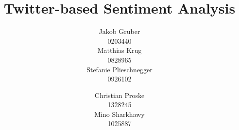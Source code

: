 \documentclass{acm_proc_article-sp}
\begin{document}
\title{Twitter-based Sentiment Analysis}

%
%
%
%
%

%
\author{
%
%
\alignauthor Jakob Gruber\\
      0203440\\
       \email{}
\alignauthor Matthias Krug\\
      0828965\\
       \email{}
\alignauthor Stefanie Plieschnegger\\
      0926102\\
\and  %
\alignauthor Christian Proske\\
	 1328245 \\
       \email{}
\alignauthor Mino Sharkhawy  \\
      1025887 \\
       \email{}
}
\end{document}
